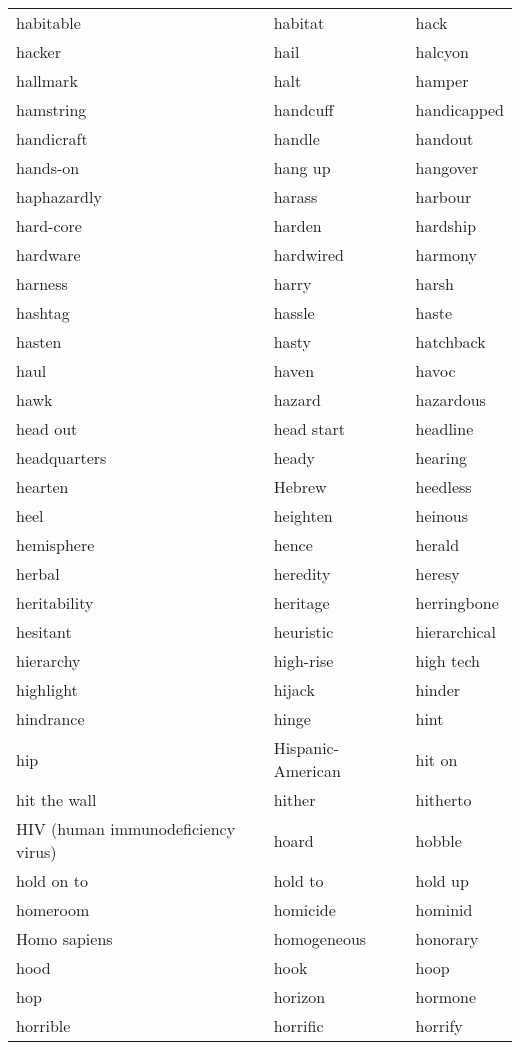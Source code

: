 \documentclass{minimal}
\begin{document}
\begin{longtable}{p{2.7cm}@{\hskip 0.2cm}p{2.7cm}@{\hskip 0.2cm}p{2.7cm}}
habitable & habitat & hack \\
hacker & hail & halcyon \\
hallmark & halt & hamper \\
hamstring & handcuff & handicapped \\
handicraft & handle & handout \\
hands-on & hang up & hangover \\
haphazardly & harass & harbour \\
hard-core & harden & hardship \\
hardware & hardwired & harmony \\
harness & harry & harsh \\
hashtag & hassle & haste \\
hasten & hasty & hatchback \\
haul & haven & havoc \\
hawk & hazard & hazardous \\
head out & head start & headline \\
headquarters & heady & hearing \\
hearten & Hebrew & heedless \\
heel & heighten & heinous \\
hemisphere & hence & herald \\
herbal & heredity & heresy \\
heritability & heritage & herringbone \\
hesitant & heuristic & hierarchical \\
hierarchy & high-rise & high tech \\
highlight & hijack & hinder \\
hindrance & hinge & hint \\
hip & Hispanic-American & hit on \\
hit the wall & hither & hitherto \\
HIV (human immunodeficiency virus) & hoard & hobble \\
hold on to & hold to & hold up \\
homeroom & homicide & hominid \\
Homo sapiens & homogeneous & honorary \\
hood & hook & hoop \\
hop & horizon & hormone \\
horrible & horrific & horrify \\

\end{longtable}
\end{document}
